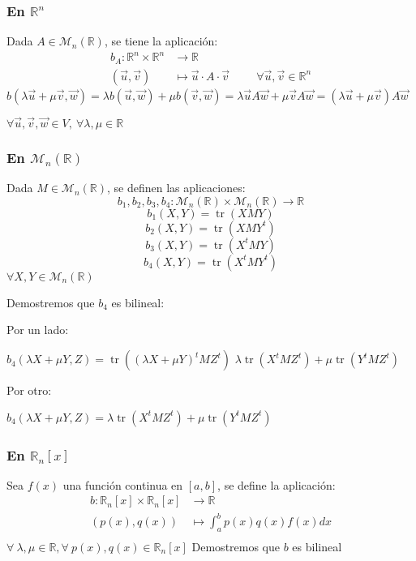 \documentclass[x11names,table]{report}
\DeclareMathOperator{\tr}{tr}
\begin{document}
\subsubsection*{En $\mathbb{R}^n$}

Dada $A\in \mathcal{M}_n(\mathbb{R})$, se tiene la aplicación:
\[
\begin{split}
b_A:\mathbb{R}^n\times\mathbb{R}^n &\longrightarrow\mathbb{R}\\
(\vec{u},\vec{v})&\longmapsto\vec{u}\cdot A\cdot\vec{v} \hspace{1cm} \forall \vec{u},\vec{v}\in\mathbb{R}^n
\end{split}
\]
$b(\lambda\vec{u}+\mu\vec{v},\vec{w})=\lambda b(\vec{u},\vec{w})+\mu b(\vec{v},\vec{w})=\lambda\vec{u}A\vec{w}+\mu\vec{v}A\vec{w}=(\lambda\vec{u}+\mu \vec{v})A\vec{w}$

$\forall\vec{u},\vec{v},\vec{w}\in V,\  \forall \lambda,\mu\in\mathbb{R}$
\subsubsection*{En $\mathcal{M}_n(\mathbb{R})$}

Dada $M\in \mathcal{M}_n(\mathbb{R})$, se definen las aplicaciones:
\[
b_1,b_2,b_3,b_4: \mathcal{M}_n(\mathbb{R})\times\mathcal{M}_n(\mathbb{R}) \longrightarrow\mathbb{R}
\]\[
b_1(X,Y)=\tr(XMY)\]\[
b_2(X,Y)=\tr(XMY^t)\]\[
b_3(X,Y)=\tr(X^tMY)\]\[
b_4(X,Y)=\tr(X^tMY^t)
\]
$\forall X,Y\in \mathcal{M}_n(\mathbb{R})$

Demostremos que $b_4$ es bilineal:

Por un lado:

$b_4(\lambda X+\mu Y,Z)=\tr((\lambda X+\mu Y)^tMZ^t)$  $\lambda\tr(X^tMZ^t)+\mu\tr(Y^tMZ^t)$

Por otro:

$b_4(\lambda X+\mu Y,Z)=\lambda \tr(X^tMZ^t)+\mu\tr(Y^tMZ^t)$

\subsubsection*{En $\mathbb{R}_n[x]$}

Sea $f(x)$ una función continua en $[a,b]$, se define la aplicación:
\[
\begin{split}
b: \mathbb{R}_n[x]\times\mathbb{R}_n[x]&\longrightarrow\mathbb{R}\\
(p(x),q(x))&\longmapsto\int_a^b p(x)q(x)f(x)dx\\
\end{split}
\]$\forall\ \lambda,\mu\in\mathbb{R},\forall\ p(x),q(x)\in \mathbb{R}_n[x]$
Demostremos que $b$ es bilineal
\end{document}
